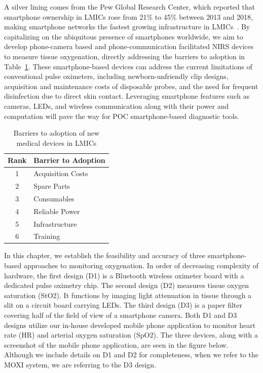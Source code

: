 A silver lining comes from the Pew Global Research Center, which reported that smartphone ownership in \ac{LMIC}s rose from 21\% to 45\% between 2013 and 2018, making smartphone networks the fastest growing infrastructure in LMICs~\cite{Poushter2016}. By capitalizing on the ubiquitous presence of smartphones worldwide, we aim to develop phone-camera based and phone-communication facilitated NIRS devices to measure tissue oxygenation, directly addressing the barriers to adoption in Table~\ref{tab:lmicbarriers}. These smartphone-based devices can address the current limitations of conventional pulse oximeters, including newborn-unfriendly clip designs, acquisition and maintenance costs of disposable probes, and the need for frequent disinfection due to direct skin contact. Leveraging smartphone features such as cameras, LEDs, and wireless communication along with their power and computation will pave the way for POC smartphone-based diagnostic tools. 

\begin{table}[]
\centering
\caption{Barriers to adoption of new medical devices in LMICs}
\label{tab:lmicbarriers}
\begin{tabular}{@{}cl@{}}
\toprule
Rank & Barrier to Adoption \\ \midrule
1    & Acquisition Costs   \\
2    & Spare Parts         \\
3    & Consumables         \\
4    & Reliable Power      \\
5    & Infrastructure      \\
6    & Training            \\ \bottomrule
\end{tabular}
\end{table}

In this chapter, we establish the feasibility and accuracy of three smartphone-based approaches to monitoring oxygenation. In order of decreasing complexity of hardware, the first design (D1) is a Bluetooth wireless oximeter board with a dedicated pulse oximetry chip. The second design (D2) measures tissue oxygen saturation (StO2). It functions by imaging light attenuation in tissue through a slit on a circuit board carrying LEDs. The third design (D3) is a paper filter covering half of the field of view of a smartphone camera. Both D1 and D3 designs utilize our in-house developed mobile phone application to monitor heart rate (HR) and arterial oxygen saturation (SpO2). The three devices, along with a screenshot of the mobile phone application, are seen in the figure below. Although we include details on D1 and D2 for completeness, when we refer to the \ac{MOXI} system, we are referring to the D3 design. 

